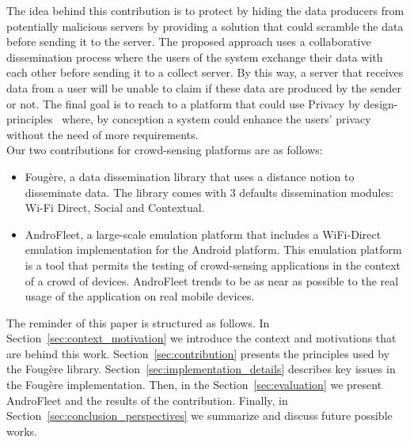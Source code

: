 The idea behind this contribution is to protect by hiding the data producers from potentially malicious servers by providing a solution that could scramble the data before sending it to the server.
The proposed approach uses a collaborative dissemination process where the users of the system exchange their data with each other before sending it to a collect server.
By this way, a server that receives data from a user will be unable to claim if these data are produced by the sender or not.
The final goal is to reach to a platform that could use Privacy by design-principles~\cite{langheinrich2001privacy} where, by conception a system could enhance the users' privacy without the need of more requirements.
\\

Our two contributions for crowd-sensing platforms are as follows:
\begin{itemize}
	\item Foug\`ere, a data dissemination library that uses a distance notion to disseminate data.
	The library comes with 3 defaults dissemination modules: Wi-Fi Direct, Social and Contextual.
	\item AndroFleet, a large-scale emulation platform that includes a WiFi-Direct emulation implementation for the Android platform. 
	This emulation platform is a tool that permits the testing of crowd-sensing applications in the context of a crowd of devices. 
	AndroFleet trends to be as near as possible to the real usage of the application on real mobile devices.
\end{itemize} 


The reminder of this paper is structured as follows.
In Section~\ref{sec:context_motivation} we introduce the context and motivations that are behind this work.
Section~\ref{sec:contribution} presents the principles used by the Foug\`ere library.
Section~\ref{sec:implementation_details} describes key issues in the Foug\`ere implementation.
Then, in the Section~\ref{sec:evaluation} we present AndroFleet and the results of the contribution.
Finally, in Section~\ref{sec:conclusion_perspectives} we summarize and discuss future possible works.

